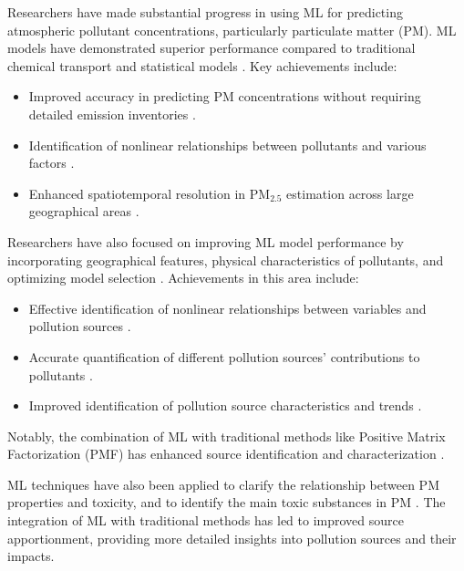 \documentclass{book}
\numberwithin{equation}{section}
\numberwithin{figure}{section}
\begin{document}
Researchers have made substantial progress in using ML for predicting atmospheric pollutant concentrations, particularly particulate matter (PM). ML models have demonstrated superior performance compared to traditional chemical transport and statistical models \citep{peng2024application}. Key achievements include:
\begin{itemize}
    \item Improved accuracy in predicting PM concentrations without requiring detailed emission inventories \citep{masih2019}.
    \item Identification of nonlinear relationships between pollutants and various factors \citep{wang2023b}.
    \item Enhanced spatiotemporal resolution in PM$_{2.5}$ estimation across large geographical areas \citep{di2019}.
\end{itemize}

Researchers have also focused on improving ML model performance by incorporating geographical features, physical characteristics of pollutants, and optimizing model selection \citep{peng2024application}. Achievements in this area include:
\begin{itemize}
    \item Effective identification of nonlinear relationships between variables and pollution sources \citep{borlaza2021}.
    \item Accurate quantification of different pollution sources' contributions to pollutants \citep{kumar2022}.
    \item Improved identification of pollution source characteristics and trends \citep{zheng2023}.
\end{itemize}

Notably, the combination of ML with traditional methods like Positive Matrix Factorization (PMF) has enhanced source identification and characterization \citep{peng2024application}.

ML techniques have also been applied to clarify the relationship between PM properties and toxicity, and to identify the main toxic substances in PM \citep{peng2024application}. The integration of ML with traditional methods has led to improved source apportionment, providing more detailed insights into pollution sources and their impacts.
\end{document}
